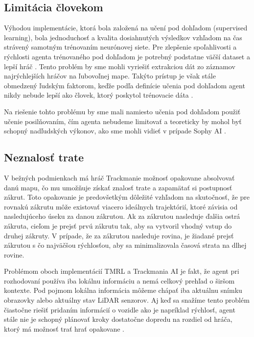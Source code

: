\subsection{Limitácia človekom}
Výhodou implementácie, ktorá bola založená na učení pod dohľadom (supervised learning), bola jednoduchosť a kvalita dosiahnutých výsledkov vzhľadom na čas strávený samotným trénovaním neurónovej siete. Pre zlepšenie spoľahlivosti a rýchlosti agenta trénovaného pod dohľadom je potrebný podstatne väčší dataset a lepší hráč \cite{trackmania_ai_github}. Tento problém by sme mohli vyriešiť extrakciou dát zo záznamov najrýchlejších hráčov na ľubovoľnej mape. Takýto prístup je však stále obmedzený ľudským faktorom, keďže podľa definície učenia pod dohľadom agent nikdy nebude lepší ako človek, ktorý poskytol trénovacie dáta \cite{artificial_intelligence_modern_aproach}.

Na riešenie tohto problému by sme mali namiesto učenia pod dohľadom použiť učenie posilňovaním, čím agenta nebudeme limitovať a teoreticky by mohol byť schopný nadľudských výkonov, ako sme mohli vidieť v prípade Sophy AI \cite{sophy_ai, super_human_grand_turismo}.

\subsection{Neznalosť trate}
V bežných podmienkach má hráč Trackmanie možnosť opakovane absolvovať danú mapu, čo mu umožňuje získať znalosť trate a zapamätať si postupnosť zákrut. Toto opakovanie je predovšetkým dôležité vzhľadom na skutočnosť, že pre rovnakú zákrutu môže existovať viacero ideálnych trajektórií, ktoré závisia od nasledujúceho úseku za danou zákrutou. Ak za zákrutou nasleduje ďalšia ostrá zákruta, cieľom je prejsť prvú zákrutu tak, aby sa vytvoril vhodný vstup do druhej zákruty. V prípade, že za zákrutou nasleduje rovina, je žiadané prejsť zákrutou s čo najväčšou rýchlosťou, aby sa minimalizovala časová strata na dlhej rovine.

Problémom oboch implementácií TMRL a Trackmania AI je fakt, že agent pri rozhodovaní používa iba lokálnu informáciu a nemá celkový prehľad o širšom kontexte. Pod pojmom lokálna informácia môžeme chápať iba aktuálnu snímku obrazovky alebo aktuálny stav LiDAR senzorov. Aj keď sa snažíme tento problém čiastočne riešiť pridaním informácií o vozidle ako je napríklad rýchlosť, agent stále nie je schopný plánovať kroky dostatočne dopredu na rozdiel od hráča, ktorý má možnosť trať hrať opakovane \cite{tmrl_github, trackmania_ai_github}.

